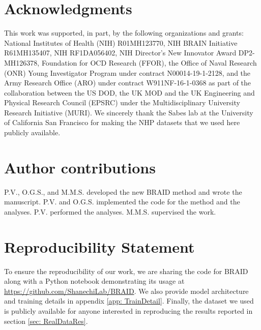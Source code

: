\documentclass{article} %
\newcommand{\ourmethod}{BRAID}
\begin{document}

\section{Acknowledgments}
This work was supported, in part, by the following organizations and grants: National Institutes of Health (NIH) R01MH123770, NIH BRAIN Initiative R61MH135407, NIH RF1DA056402, NIH Director’s New Innovator Award DP2-MH126378, Foundation for OCD Research (FFOR), the Office of Naval Research (ONR) Young Investigator Program under contract N00014-19-1-2128, and the Army Research Office (ARO) under contract W911NF-16-1-0368 as part of the collaboration between the US DOD, the UK MOD and the UK Engineering and Physical Research Council (EPSRC) under the Multidisciplinary University Research Initiative (MURI). We sincerely thank the Sabes lab at the University of California San Francisco for making the NHP datasets that we used here publicly available.

\section{Author contributions} %
P.V., O.G.S., and M.M.S. developed the new BRAID method and wrote the manuscript. P.V. and O.G.S. implemented the code for the method and the analyses. P.V. performed the analyses. M.M.S. supervised the work.

\section{Reproducibility Statement}
To ensure the reproducibility of our work, we are sharing the code for \ourmethod{} along with a Python notebook demonstrating its usage at \url{https://github.com/ShanechiLab/BRAID}. We also provide model architecture and training details in appendix \ref{app: TrainDetail}. Finally, the dataset we used \citep{sabes} is publicly available for anyone interested in reproducing the results reported in section \ref{sec: RealDataRes}. 
\end{document}
